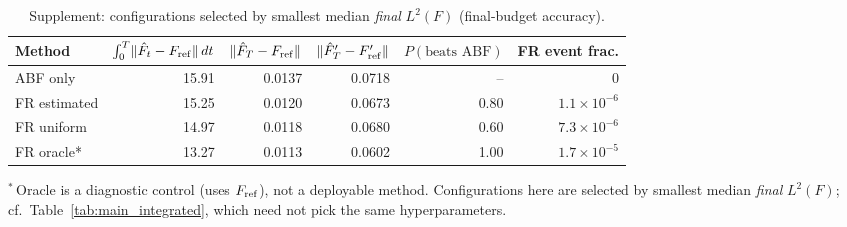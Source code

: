 \begin{table}[t]
\centering
\small
\caption{Supplement: configurations selected by smallest median \emph{final} $L^2(F)$ (final-budget accuracy).}
\label{tab:main_final}
\begin{tabular}{lrrrrr}
\toprule
Method & $\int_0^T\!\|\hat F_t-F_{\rm ref}\|\,dt$ & $\|\hat F_T-F_{\rm ref}\|$ & $\|\hat F'_T-F'_{\rm ref}\|$ & $P(\text{beats ABF})$ & FR event frac. \\
\midrule
ABF only & 15.91 & 0.0137 & 0.0718 & -- & $0$ \\
FR estimated & 15.25 & 0.0120 & 0.0673 & 0.80 & $1.1\times10^{-6}$ \\
FR uniform & 14.97 & 0.0118 & 0.0680 & 0.60 & $7.3\times10^{-6}$ \\
FR oracle* & 13.27 & 0.0113 & 0.0602 & 1.00 & $1.7\times10^{-5}$ \\
\bottomrule
\end{tabular}
\par\smallskip\footnotesize $^{*}$\,Oracle is a diagnostic control (uses $F_{\rm ref}$), not a deployable method. Configurations here are selected by smallest median \emph{final} $L^2(F)$; cf.\ Table~\ref{tab:main_integrated}, which need not pick the same hyperparameters.
\end{table}
